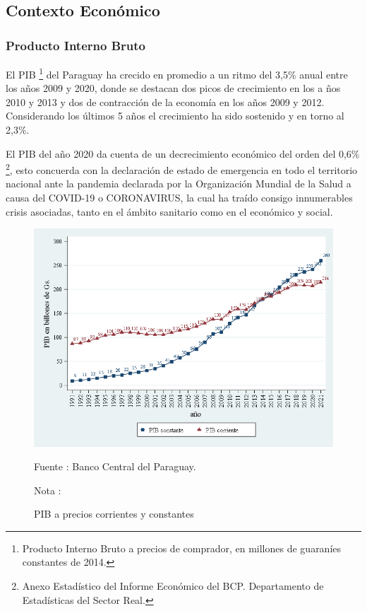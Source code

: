 \subsection{Contexto Económico}\subsubsection{Producto Interno Bruto}

El PIB
\footnote{Producto Interno Bruto a precios de comprador, en millones de guaraníes constantes de 2014.}
del Paraguay ha crecido en promedio a un ritmo del 3,5\% anual entre los
años 2009 y 2020, donde se destacan dos picos de crecimiento en los a
ños 2010 y 2013 y dos de contracción de la economía en los años 2009 y
2012. Considerando los últimos 5 años el crecimiento ha sido sostenido y
en torno al 2,3\%.

El PIB del año 2020 da cuenta de un decrecimiento económico del orden
del 0,6\%
\footnote{Anexo Estadístico del Informe Económico del BCP. Departamento de Estadísticas del Sector Real.},
esto concuerda con la declaración de estado de emergencia en todo el
territorio nacional ante la pandemia declarada por la Organización
Mundial de la Salud a causa del COVID-19 o CORONAVIRUS, la cual ha
traído consigo innumerables crisis asociadas, tanto en el ámbito
sanitario como en el económico y social.

\begin{figure}[H]
\begin{center}
                    \caption{PIB a precios corrientes y constantes}
                    \includegraphics[scale=0.55]{BCP_pib_corr_cte.png}
                                    \item \footnotesize Fuente : Banco Central del Paraguay. 
                                    \item \footnotesize Nota : 
                    \end{center}
\end{figure}

